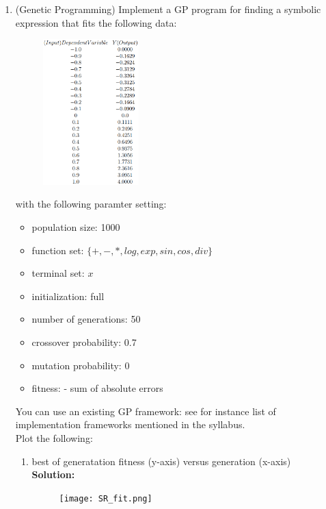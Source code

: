 \documentclass[a4paper]{article}
\begin{document}
\begin{enumerate}
	\item (Genetic Programming) Implement a GP program for finding a symbolic expression that fits the following data:

	\begin{figure}[ht!]
	\centering
  	\includegraphics[width=0.35\textwidth]{images/table.PNG}
	\end{figure}	

with the following paramter setting:
\begin{itemize}
	\item population size: 1000
	\item function set: $\{+,-,*,log,exp,sin,cos,div \}$
	\item terminal set: $x$
	\item initialization: full
	\item number of generations: 50
	\item crossover probability: 0.7
	\item mutation probability: 0
	\item fitness: - sum of absolute errors
\end{itemize}

You can use an existing GP framework: see for instance list of implementation frameworks mentioned in the syllabus.\\

Plot the following:

\begin{enumerate}
	\item best of generatation fitness (y-axis) versus generation (x-axis)\\
	\textbf{Solution:}\\
	\begin{figure}[ht!]
	\centering
  	\texttt{[image: SR\_fit.png]}
	\end{figure}
	

\end{enumerate}
\end{enumerate}
\end{document}
